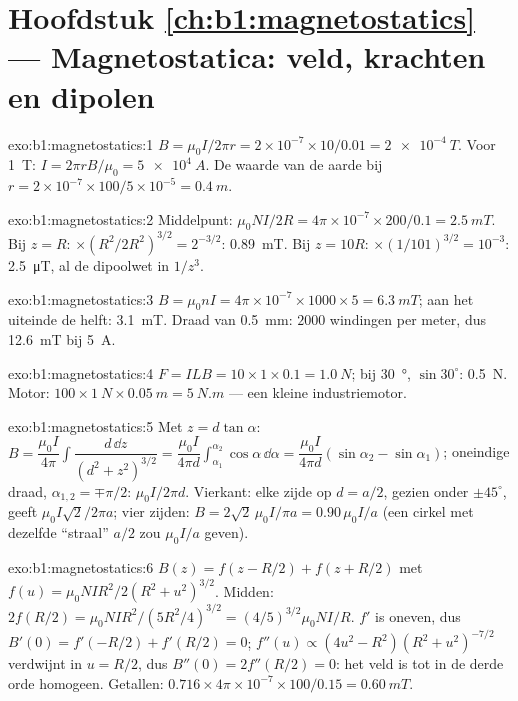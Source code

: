 \section*{Hoofdstuk \ref{ch:b1:magnetostatics} --- Magnetostatica: veld, krachten en dipolen}

\begin{solution}{exo:b1:magnetostatics:1}
$B = \mu_0I/2\pi r = 2 \times 10^{-7} \times 10/0.01 = \qty{2e-4}{T}$. Voor \qty{1}{T}:
$I = 2\pi rB/\mu_0 = \qty{5e4}{A}$. De waarde van de aarde bij $r = 2 \times 10^{-7} \times
100/5 \times 10^{-5} = \qty{0.4}{m}$.
\end{solution}

\begin{solution}{exo:b1:magnetostatics:2}
Middelpunt: $\mu_0NI/2R = 4\pi \times 10^{-7} \times 200/0.1 = \qty{2.5}{mT}$. Bij $z = R$:
$\times(R^2/2R^2)^{3/2} = 2^{-3/2}$: \qty{0.89}{mT}. Bij $z = 10R$: $\times(1/101)^{3/2}
= 10^{-3}$: \qty{2.5}{\micro T}, al de dipoolwet in $1/z^3$.
\end{solution}

\begin{solution}{exo:b1:magnetostatics:3}
$B = \mu_0nI = 4\pi \times 10^{-7} \times 1000 \times 5 = \qty{6.3}{mT}$; aan het uiteinde
de helft: \qty{3.1}{mT}. Draad van \qty{0.5}{mm}: $2000$ windingen per meter, dus
\qty{12.6}{mT} bij \qty{5}{A}.
\end{solution}

\begin{solution}{exo:b1:magnetostatics:4}
$F = ILB = 10 \times 1 \times 0.1 = \qty{1.0}{N}$; bij \qty{30}{\degree}, $\sin30^\circ$:
\qty{0.5}{N}. Motor: $100 \times \qty{1}{N} \times \qty{0.05}{m} = \qty{5}{N.m}$ ---
een kleine industriemotor.
\end{solution}

\begin{solution}{exo:b1:magnetostatics:5}
Met $z = d\tan\alpha$: $B = \dfrac{\mu_0I}{4\pi}\displaystyle\int\dfrac{d\,\dd z}{(d^2 + z^2)^{3/2}}
= \dfrac{\mu_0I}{4\pi d}\displaystyle\int_{\alpha_1}^{\alpha_2}\cos\alpha\,\dd\alpha = \dfrac{\mu_0I}{4\pi d}
(\sin\alpha_2 - \sin\alpha_1)$; oneindige draad, $\alpha_{1,2} = \mp\pi/2$: $\mu_0I/2\pi d$.
Vierkant: elke zijde op $d = a/2$, gezien onder $\pm45^\circ$, geeft $\mu_0I\sqrt2/2\pi a$;
vier zijden: $B = 2\sqrt2\,\mu_0I/\pi a = 0.90\,\mu_0I/a$ (een cirkel met dezelfde
``straal'' $a/2$ zou $\mu_0I/a$ geven).
\end{solution}

\begin{solution}{exo:b1:magnetostatics:6}
$B(z) = f(z - R/2) + f(z + R/2)$ met $f(u) = \mu_0NIR^2/2(R^2 + u^2)^{3/2}$.
Midden: $2f(R/2) = \mu_0NIR^2/(5R^2/4)^{3/2} = (4/5)^{3/2}\mu_0NI/R$. $f'$ is
oneven, dus $B'(0) = f'(-R/2) + f'(R/2) = 0$; $f''(u) \propto (4u^2 - R^2)(R^2 +
u^2)^{-7/2}$ verdwijnt in $u = R/2$, dus $B''(0) = 2f''(R/2) = 0$: het veld is
tot in de derde orde homogeen. Getallen: $0.716 \times 4\pi \times 10^{-7} \times 100/0.15 =
\qty{0.60}{mT}$.
\end{solution}

